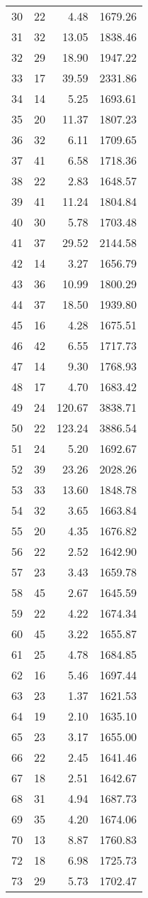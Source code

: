 \begin{appendix}
\begin{longtable}{rrrr}
30 & 22 & 4.48 & 1679.26 \\
31 & 32 & 13.05 & 1838.46 \\
32 & 29 & 18.90 & 1947.22 \\
33 & 17 & 39.59 & 2331.86 \\
34 & 14 & 5.25 & 1693.61 \\
35 & 20 & 11.37 & 1807.23 \\
36 & 32 & 6.11 & 1709.65 \\
37 & 41 & 6.58 & 1718.36 \\
38 & 22 & 2.83 & 1648.57 \\
39 & 41 & 11.24 & 1804.84 \\
40 & 30 & 5.78 & 1703.48 \\
41 & 37 & 29.52 & 2144.58 \\
42 & 14 & 3.27 & 1656.79 \\
43 & 36 & 10.99 & 1800.29 \\
44 & 37 & 18.50 & 1939.80 \\
45 & 16 & 4.28 & 1675.51 \\
46 & 42 & 6.55 & 1717.73 \\
47 & 14 & 9.30 & 1768.93 \\
48 & 17 & 4.70 & 1683.42 \\
49 & 24 & 120.67 & 3838.71 \\
50 & 22 & 123.24 & 3886.54 \\
51 & 24 & 5.20 & 1692.67 \\
52 & 39 & 23.26 & 2028.26 \\
53 & 33 & 13.60 & 1848.78 \\
54 & 32 & 3.65 & 1663.84 \\
55 & 20 & 4.35 & 1676.82 \\
56 & 22 & 2.52 & 1642.90 \\
57 & 23 & 3.43 & 1659.78 \\
58 & 45 & 2.67 & 1645.59 \\
59 & 22 & 4.22 & 1674.34 \\
60 & 45 & 3.22 & 1655.87 \\
61 & 25 & 4.78 & 1684.85 \\
62 & 16 & 5.46 & 1697.44 \\
63 & 23 & 1.37 & 1621.53 \\
64 & 19 & 2.10 & 1635.10 \\
65 & 23 & 3.17 & 1655.00 \\
66 & 22 & 2.45 & 1641.46 \\
67 & 18 & 2.51 & 1642.67 \\
68 & 31 & 4.94 & 1687.73 \\
69 & 35 & 4.20 & 1674.06 \\
70 & 13 & 8.87 & 1760.83 \\
72 & 18 & 6.98 & 1725.73 \\
73 & 29 & 5.73 & 1702.47 \\
\bottomrule
\end{longtable}


\end{appendix}
